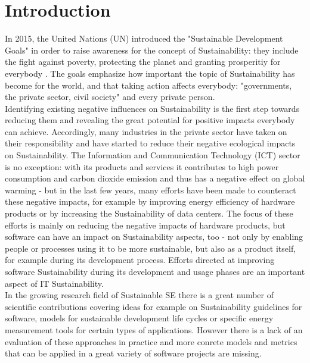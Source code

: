 \documentclass[oribibl]{llncs}
\begin{document}
\section{Introduction}
In 2015, the United Nations (UN) introduced the "Sustainable Development Goals" \cite{UN_transform_15} in order to raise awareness for the concept of Sustainability: they include the fight against poverty, protecting the planet and granting prosperitiy for everybody \cite{nino_sustainable_2017}. The goals emphasize how important the topic of Sustainability has become for the world, and that taking action affects everybody: "governments, the private sector, civil society"\cite[p.\,1]{nino_sustainable_2017} and every private person.\\
Identifying existing negative influences on Sustainability is the first step towards reducing them and revealing the great potential for positive impacts  everybody can achieve. Accordingly, many industries in the private sector  have taken on their responsibility and have started to reduce their negative ecological impacts on Sustainability. The Information and Communication Technology (ICT) sector is no exception: with its products and services it contributes to high power consumption and carbon dioxide emission \cite{gartner07} and thus has a negative effect on global warming \cite{smart2020} - but in the last few years, many efforts have been made to counteract these negative impacts, for example by improving energy efficiency of hardware products or by increasing the Sustainability of data centers. %
The focus of these efforts is mainly on reducing the negative impacts of hardware products, but software can have an impact on Sustainability aspects, too - not only by enabling people or processes using it to be more sustainable, but also as a product itself, for example during its development process. %
Efforts directed at improving software Sustainability during its development and usage phases are an important aspect of IT Sustainability.\\
In the growing research field of Sustainable SE there is a great number of scientific contributions covering ideas for example on Sustainability guidelines for software, models for sustainable development life cycles or specific energy measurement tools for certain types of applications. However there is a lack of an evaluation of these approaches in practice and more conrete models and metrics that can be applied in a great variety of software projects are missing.
\end{document}
